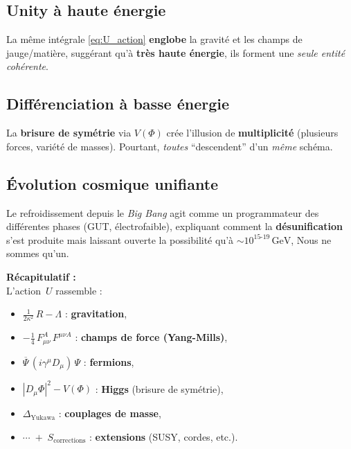 \documentclass[12pt]{article}
\begin{document}
\subsection{Unity \`a haute \'energie}

La m\^eme int\'egrale \eqref{eq:U_action} \textbf{englobe} la gravit\'e et 
les champs de jauge/mati\`ere, sugg\'erant qu'\`a \textbf{tr\`es haute \'energie}, 
ils forment une \emph{seule entit\'e coh\'erente}.

\subsection{Diff\'erenciation \`a basse \'energie}

La \textbf{brisure de sym\'etrie} via \(V(\Phi)\) cr\'ee l'\og illusion\fg{} 
de \textbf{multiplicit\'e} (plusieurs forces, vari\'et\'e de masses). 
Pourtant, \emph{toutes} \enquote{descendent} d'un \emph{m\^eme} sch\'ema.

\subsection{\'Evolution cosmique unifiante}

Le refroidissement depuis le \emph{Big Bang} agit comme un \og programmateur\fg{}
des diff\'erentes phases (GUT, \'electrofaible), 
expliquant comment la \textbf{d\'esunification} s'est produite 
mais laissant ouverte la possibilit\'e qu'\`a \(\sim 10^{15\text{-}19}\,\mathrm{GeV}\), 
\og Nous ne sommes qu'un\fg.

\bigskip

\noindent
\textbf{R\'ecapitulatif :} \\
L'action \(\,U\) rassemble :
\begin{itemize}
\item \(\frac{1}{2\kappa^2}\,R - \Lambda\) : \textbf{gravitation}, 
\item \(-\tfrac14\,F_{\mu\nu}^A\,F^{\mu\nu A}\) : \textbf{champs de force (Yang-Mills)},
\item \(\overline{\Psi}\,(i\gamma^\mu D_\mu)\,\Psi\) : \textbf{fermions},
\item \(|D_\mu \Phi|^2 - V(\Phi)\) : \textbf{Higgs} (brisure de sym\'etrie),
\item \(\Delta_{\mathrm{Yukawa}}\) : \textbf{couplages de masse},
\item \(\cdots\;+\;S_{\text{corrections}}\) : \textbf{extensions} (SUSY, cordes, etc.).
\end{itemize}
\end{document}
